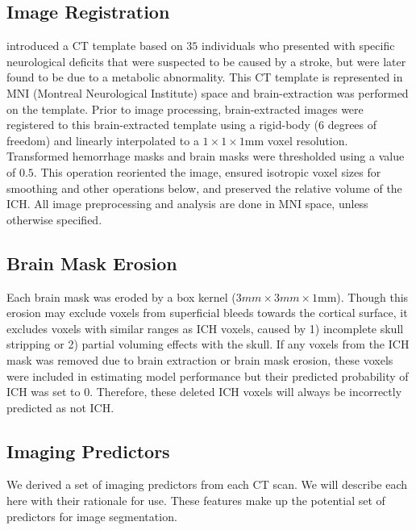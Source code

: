 \documentclass{elsarticle_nonatbib}\usepackage[]{graphicx}\usepackage[]{color}
\begin{document}
\subsection{Image Registration}
\citet{rorden_age-specific_2012} introduced a CT template based on $35$ individuals who presented with specific neurological deficits that were suspected to be caused by a stroke, but were later found to be due to a metabolic abnormality.  This CT template is represented in MNI (Montreal Neurological Institute) space and brain-extraction was performed on the template.  Prior to image processing, brain-extracted images were registered to this brain-extracted template using a rigid-body (6 degrees of freedom) and linearly interpolated to a $1\times1\times1$mm voxel resolution.  Transformed hemorrhage masks and brain masks were thresholded using a value of $0.5$. This operation reoriented the image, ensured isotropic voxel sizes for smoothing and other operations below, and preserved the relative volume of the ICH.  All image preprocessing and analysis are done in MNI space, unless otherwise specified.


\subsection{Brain Mask Erosion}
Each brain mask was eroded by a box kernel ($3mm\times3mm\times1$mm).  Though this erosion may exclude voxels from superficial bleeds towards the cortical surface, it excludes voxels with similar ranges as ICH voxels, caused by 1) incomplete skull stripping or 2) partial voluming effects with the skull.  If any voxels from the ICH mask was removed due to brain extraction or brain mask erosion, these voxels were included in estimating model performance but their predicted probability of ICH was set to $0$.  Therefore, these deleted ICH voxels will always be incorrectly predicted as not ICH.  




\subsection{Imaging Predictors}
We derived a set of imaging predictors from each CT scan.  We will describe each here with their rationale for use.  These features make up the potential set of predictors for image segmentation.
\end{document}
